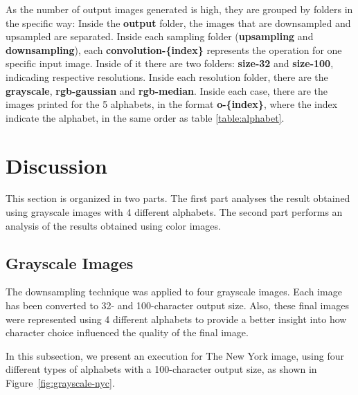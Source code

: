 \documentclass[]{IEEEtran}
\begin{document}

As the number of output images generated is high, they are grouped by folders in the specific way: Inside the \textbf{output} folder, the images that are downsampled and upsampled are separated. Inside each sampling folder (\textbf{upsampling} and \textbf{downsampling}), each \textbf{convolution-\{index\}} represents the operation for one specific input image. Inside of it there are two folders: \textbf{size-32} and \textbf{size-100}, indicading respective resolutions. Inside each resolution folder, there are the \textbf{grayscale}, \textbf{rgb-gaussian} and \textbf{rgb-median}. Inside each case, there are the images printed for the 5 alphabets, in the format \textbf{o-\{index\}}, where the index indicate the alphabet, in the same order as table \ref{table:alphabet}.  

\section{Discussion}

This section is organized in two parts. The first part analyses the result obtained using grayscale images with 4 different alphabets. The second part performs an analysis of the results obtained using color images.

\subsection{Grayscale Images}

The downsampling technique was applied to four grayscale images. Each image has been converted to 32- and 100-character output size. Also, these final images were represented using 4 different alphabets to provide a better insight into how character choice influenced the quality of the final image.

In this subsection, we present an execution for The New York image, using four different types of alphabets with a 100-character output size, as shown in Figure~\ref{fig:grayscale-nyc}.
\end{document}
